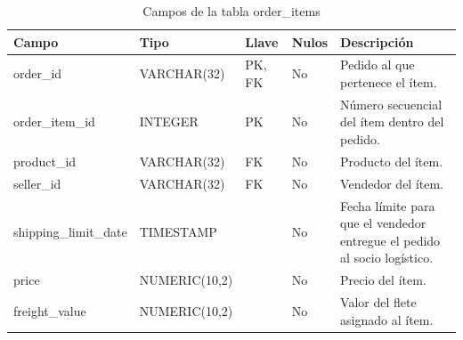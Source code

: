 \documentclass[a4paper,stu,12pt,donotrepeattitle,floatsintext]{apa7}
\begin{document}
{\footnotesize
\begin{longtable}{|>{\raggedright\arraybackslash}p{}|>{\raggedright\arraybackslash}p{}|>{\raggedright\arraybackslash}p{}|>{\raggedright\arraybackslash}p{}|>{\raggedright\arraybackslash}p{}|}
\caption{Campos de la tabla order\_items}\\
\hline
\textbf{Campo} & \textbf{Tipo} & \textbf{Llave} & \textbf{Nulos} & \textbf{Descripción} \\ \hline
\endhead
order\_\allowbreak{}id & VARCHAR(32) & PK, FK & No & Pedido al que pertenece el ítem. \\ \hline
order\_\allowbreak{}item\_\allowbreak{}id & INTEGER & PK & No & Número secuencial del ítem dentro del pedido. \\ \hline
product\_\allowbreak{}id & VARCHAR(32) & FK & No & Producto del ítem. \\ \hline
seller\_\allowbreak{}id & VARCHAR(32) & FK & No & Vendedor del ítem. \\ \hline
shipping\_\allowbreak{}limit\_\allowbreak{}date & TIMESTAMP &  & No & Fecha límite para que el vendedor entregue el pedido al socio logístico. \\ \hline
price & NUMERIC(10,2) &  & No & Precio del ítem. \\ \hline
freight\_\allowbreak{}value & NUMERIC(10,2) &  & No & Valor del flete asignado al ítem. \\ \hline
\end{longtable}
}
\end{document}
